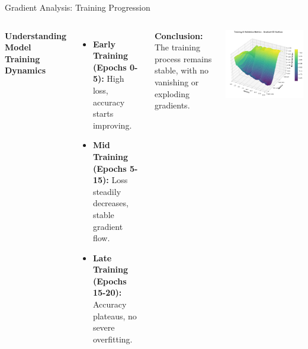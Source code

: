 \begin{frame}{Gradient Analysis: Training Progression}

    \begin{columns}

        \textbf{Understanding Model Training Dynamics}
        \vspace{10pt}

      \begin{itemize}
            \item \textbf{Early Training (Epochs 0-5):} High loss, accuracy starts improving.
            \item \textbf{Mid Training (Epochs 5-15):} Loss steadily decreases, stable gradient flow.
            \item \textbf{Late Training (Epochs 15-20):} Accuracy plateaus, no severe overfitting.
        \end{itemize}

          \textbf{Conclusion:} The training process remains stable, with no vanishing or exploding gradients. 


        \centering
        \includegraphics[width=0.9\linewidth]{figures/3d gradient.png} %

    \end{columns}

\end{frame}





